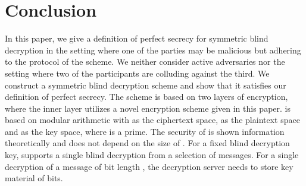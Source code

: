 \documentclass[10pt,journal]{IEEEtran}
\begin{document}
\section{Conclusion}
\label{sec:Conclusion}

In this paper, we give a definition of perfect secrecy for symmetric blind decryption in the setting where
one of the parties may be malicious but adhering to the protocol of the scheme.
We neither consider active adversaries nor the setting where two of the participants
are colluding against the third.
We construct a symmetric blind decryption scheme  and show that it satisfies our definition
of perfect secrecy. The scheme is based on two layers of encryption, where the inner layer utilizes a novel
encryption scheme  given in this paper.  is based on modular arithmetic with 
as the ciphertext space,  as the plaintext space and  as the key space, where  is a prime.
The security of  is shown information theoretically and does not depend on the size of .
For a fixed blind decryption key,  supports a single blind decryption from a selection
of  messages.
For a single decryption of a message of bit length , the decryption server
needs to store key material of  bits.
\end{document}
